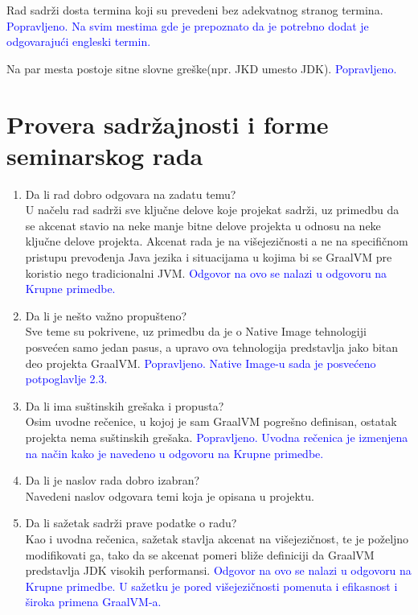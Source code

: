 \documentclass[a4paper]{report}
\newcommand{\odgovor}[1]{\textcolor{blue}{#1}}
\begin{document}
\indent Rad sadrži dosta termina koji su prevedeni bez adekvatnog stranog termina. \odgovor{Popravljeno. Na svim mestima gde je prepoznato da je potrebno dodat je odgovarajući engleski termin.}

\indent Na par mesta postoje sitne slovne greške(npr. JKD umesto JDK). \odgovor{Popravljeno.}

\section{Provera sadržajnosti i forme seminarskog rada}

\begin{enumerate}
\item Da li rad dobro odgovara na zadatu temu?\\
U načelu rad sadrži sve ključne delove koje projekat sadrži, uz primedbu da se akcenat stavio na neke manje bitne delove projekta u odnosu na 
neke ključne delove projekta. Akcenat rada je na višejezičnosti a ne na specifičnom pristupu prevođenja Java jezika i situacijama u kojima bi 
se GraalVM pre koristio nego tradicionalni JVM. 
\odgovor{Odgovor na ovo se nalazi u odgovoru na Krupne primedbe.}

\item Da li je nešto važno propušteno?\\
Sve teme su pokrivene, uz primedbu da je o Native Image tehnologiji posvećen samo jedan pasus, a upravo ova tehnologija predstavlja jako bitan 
deo projekta GraalVM. \odgovor{Popravljeno. Native Image-u sada je posvećeno potpoglavlje 2.3.}

\item Da li ima suštinskih grešaka i propusta?\\
Osim uvodne rečenice, u kojoj je sam GraalVM pogrešno definisan, ostatak projekta nema suštinskih grešaka. \odgovor{Popravljeno. Uvodna rečenica je izmenjena na način kako je navedeno u odgovoru na Krupne primedbe.}

\item Da li je naslov rada dobro izabran?\\
Navedeni naslov odgovara temi koja je opisana u projektu.

\item Da li sažetak sadrži prave podatke o radu?\\
Kao i uvodna rečenica, sažetak stavlja akcenat na višejezičnost, te je poželjno modifikovati ga, tako da se akcenat pomeri bliže definiciji da 
GraalVM predstavlja JDK visokih performansi. \odgovor{Odgovor na ovo se nalazi u odgovoru na Krupne primedbe. U sažetku je pored višejezičnosti pomenuta i efikasnost i široka primena GraalVM-a.}


\end{enumerate}
\end{document}
